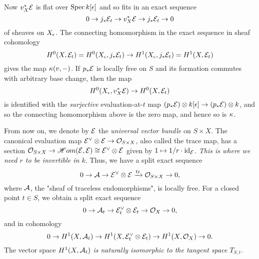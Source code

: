 \documentclass[letterpaper,10pt]{article}
\theoremstyle{remark}
\begin{document}
\begin{center}
\end{center}

Now $v_X^*\mathcal{E}$ is flat over $\operatorname{\mathrm{Spec}} k[\epsilon]$ and so fits in an exact sequence
\[ 0 \to j_* \mathcal{E}_t \to v_X^*\mathcal{E} \to j_* \mathcal{E}_t \to 0 \]
of sheaves on $X_\epsilon$. The connecting homomorphism in the exact sequence in sheaf cohomology
\[ H^0(X, \mathcal{E}_t) = H^0(X_\epsilon, j_*\mathcal{E}_t) \to H^1(X_\epsilon, j_*\mathcal{E}_t) = H^1(X, \mathcal{E}_t) \]
gives the map $\kappa(v, -)$. If $p_*\mathcal{E}$ is locally free on $S$ and its formation commutes with arbitrary base change, then the map
\[ H^0(X_\epsilon, v_X^*\mathcal{E}) \to H^0(X, \mathcal{E}_t) \]
is identified with the \emph{surjective} evaluation-at-$t$ map $(p_*\mathcal{E}) \otimes k[\epsilon] \to (p_* \mathcal{E}) \otimes k$, and so the connecting homomorphism above is the zero map, and hence so is $\kappa$. 

From now on, we denote by $\mathcal{E}$ the \emph{universal vector bundle} on $S \times X$. The canonical evaluation map $\mathcal{E}^\vee \otimes \mathcal{E} \to \mathcal{O}_{S \times X}$, also called the trace map, has a section $\mathcal{O}_{S \times X} \to \mathscr{H}om(\mathcal{E}, \mathcal{E}) \cong \mathcal{E}^\vee \otimes \mathcal{E}$ given by $1 \mapsto 1/r \cdot \mathrm{id}_{\mathcal{E}}$. \emph{This is where we need $r$ to be invertible in $k$}. Thus, we have a split exact sequence
\[ 0 \to \mathcal{A} \to \mathcal{E}^\vee \otimes \mathcal{E} \xrightarrow{\mathrm{tr}} \mathcal{O}_{S \times X} \to 0, \]
where $\mathcal{A}$, the "sheaf of traceless endomorphisms", is locally free. For a closed point $t \in S$, we obtain a split exact sequence
\[ 0 \to \mathcal{A}_t \to \mathcal{E}_t^\vee \otimes \mathcal{E}_t \to \mathcal{O}_X \to 0, \]
and in cohomology
\begin{equation} \label{H1exact}
    0 \to H^1(X, \mathcal{A}_t) \to H^1(X, \mathcal{E}_t^\vee \otimes \mathcal{E}_t) \to H^1(X, \mathcal{O}_X) \to 0.
\end{equation}
The vector space $H^1(X, \mathcal{A}_t)$ \emph{is naturally isomorphic to the tangent space} $T_{S,t}$. 
\end{document}
